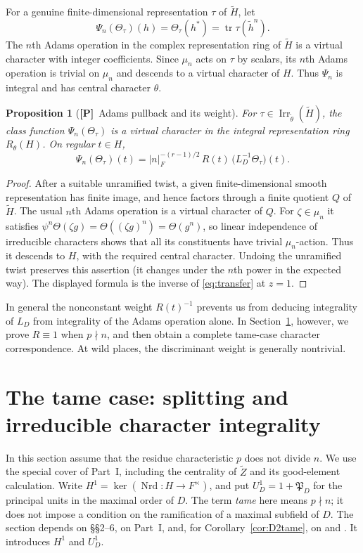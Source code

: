 \documentclass[11pt]{article}
\newcommand{\Nrd}{\operatorname{Nrd}}
\newcommand{\Irr}{\operatorname{Irr}}
\newcommand{\tH}{\widetilde H}
\newcommand{\tZ}{\widetilde Z}
\newcommand{\Ptag}{\textnormal{\textbf{[P]}}}
\theoremstyle{plain}
\newtheorem{proposition}[theorem]{Proposition}
\theoremstyle{definition}
\begin{document}
For a genuine finite-dimensional representation $\tau$ of $\tH$, let
\[
\Psi_n(\Theta_\tau)(h)=\Theta_\tau(h^*)=\operatorname{tr}\tau(\widetilde h^n).
\]
The $n$th Adams operation in the complex representation ring of $\tH$ is a virtual character with integer coefficients. Since $\mu_n$ acts on $\tau$ by scalars, its $n$th Adams operation is trivial on $\mu_n$ and descends to a virtual character of $H$. Thus $\Psi_n$ is integral and has central character $\theta$.

\begin{proposition}[\Ptag\ Adams pullback and its weight]\label{prop:adams}
For $\tau\in\Irr_{\widetilde\theta}(\tH)$, the class function $\Psi_n(\Theta_\tau)$ is a virtual character in the integral representation ring $R_\theta(H)$. On regular $t\in H$,
\begin{equation}\label{eq:adamsweight}
\Psi_n(\Theta_\tau)(t)=
|n|_F^{-(r-1)/2}\,R(t)\,\bigl(L_D^{-1}\Theta_\tau\bigr)(t).
\end{equation}
\end{proposition}
\begin{proof}
After a suitable unramified twist, a given finite-dimensional smooth representation has finite image, and hence factors through a finite quotient $Q$ of $\tH$. The usual $n$th Adams operation is a virtual character of $Q$. For $\zeta\in\mu_n$ it satisfies $\psi^n\Theta(\zeta g)=\Theta((\zeta g)^n)=\Theta(g^n)$, so linear independence of irreducible characters shows that all its constituents have trivial $\mu_n$-action. Thus it descends to $H$, with the required central character. Undoing the unramified twist preserves this assertion (it changes under the $n$th power in the expected way). The displayed formula is the inverse of \eqref{eq:transfer} at $z=1$.
\end{proof}

In general the nonconstant weight $R(t)^{-1}$ prevents us from deducing integrality of $L_D$ from integrality of the Adams operation alone. In Section~\ref{sec:tame}, however, we prove $R\equiv1$ when $p\nmid n$, and then obtain a complete tame-case character correspondence. At wild places, the discriminant weight is generally nontrivial.


\section{The tame case: splitting and irreducible character integrality}\label{sec:tame}
In this section assume that the residue characteristic $p$ does not divide $n$.
We use the special cover of Part~I, including the centrality of $\tZ$ and
its good-element calculation. Write $H^1=\ker(\Nrd:H\to F^\times)$,
and put $U_D^1=1+\mathfrak P_D$ for the principal units in the maximal
order of $D$. The term \emph{tame} here means $p\nmid n$; it does not
impose a condition on the ramification of a maximal subfield of $D$. The section depends on \S\S2--6, on Part~I, and, for Corollary~\ref{cor:D2tame}, on \cite{DKV} and \cite{Zou}. It introduces $H^1$ and $U_D^1$.
\end{document}
